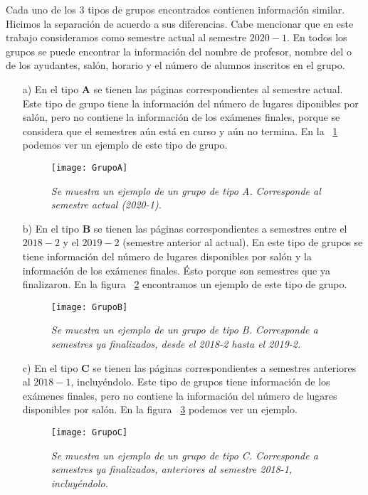 Cada uno de los 3 tipos de grupos encontrados contienen información similar. Hicimos la separación de acuerdo a sus diferencias. Cabe mencionar que en este trabajo consideramos como semestre actual al semestre $2020-1$. En todos los grupos se puede encontrar la información del nombre de profesor, nombre del o de los ayudantes, salón, horario y el número de alumnos inscritos en el grupo.

\begin{enumerate}
\item[a)] En el tipo \textbf{A} se tienen las páginas correspondientes al semestre actual. Este tipo de grupo tiene la información del número de lugares diponibles por salón, pero no contiene la información de los exámenes finales, porque se considera que el semestres aún está en curso y aún no termina. En la \figurename{~\ref{GpoA}} podemos ver un ejemplo de este tipo de grupo.

\begin{figure}[H]
\centering
\texttt{[image: GrupoA]} %
\caption[\textit{Tipo de grupo A}]{\textit{Se muestra un ejemplo de un grupo de tipo A. Corresponde al semestre actual (2020-1).}}\label{GpoA}
\end{figure}

\item[b)] En el tipo \textbf{B} se tienen las páginas correspondientes a semestres entre el $2018-2$ y el $2019-2$ (semestre anterior al actual). En este tipo de grupos se tiene información del número de lugares disponibles por salón y la información de los exámenes finales. Ésto porque son semestres que ya finalizaron. En la figura \figurename{~\ref{GpoB}} encontramos un ejemplo de este tipo de grupo.

\begin{figure}[H]
\centering
\texttt{[image: GrupoB]} %
\caption[\textit{Tipo de grupo B}]{\textit{Se muestra un ejemplo de un grupo de tipo B. Corresponde a semestres ya finalizados, desde el 2018-2 hasta el 2019-2.}}\label{GpoB}
\end{figure}

\item[c)] En el tipo \textbf{C} se tienen las páginas correspondientes a semestres anteriores al $2018-1$, incluyéndolo. Este tipo de grupos tiene información de los exámenes finales, pero no contiene la información del número de lugares disponibles por salón. En la figura \figurename{~\ref{GpoC}} podemos ver un ejemplo.

\begin{figure}[H]
\centering
\texttt{[image: GrupoC]} %
\caption[\textit{Tipo de grupo C}]{\textit{Se muestra un ejemplo de un grupo de tipo C. Corresponde a semestres ya finalizados, anteriores al semestre 2018-1, incluyéndolo.}}\label{GpoC}
\end{figure}
\end{enumerate}


